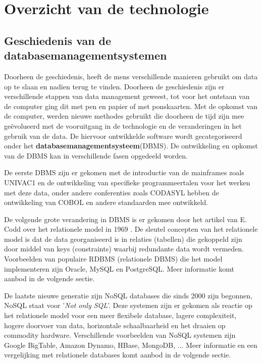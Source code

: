\chapter{Overzicht van de technologie}

\section{Geschiedenis van de databasemanagementsystemen}
Doorheen de geschiedenis, heeft de mens verschillende manieren gebruikt om data op te slaan en nadien terug te vinden. Doorheen de geschiedenis zijn er verschillende stappen van data management geweest, tot voor het ontstaan van de computer ging dit met pen en papier of met ponskaarten\cite{gray2007data}. Met de opkomst van de computer, werden nieuwe methodes gebruikt die doorheen de tijd zijn mee geëvolueerd met de vooruitgang in de technologie en de veranderingen in het gebruik van de data. De hiervoor ontwikkelde software wordt gecategoriseerd onder het \textbf{databasemanagementsysteem}(DBMS). De ontwikkeling en opkomst van de DBMS kan in verschillende fasen opgedeeld worden.  

De eerste DBMS zijn er gekomen met de introductie van de mainframes zoals UNIVAC1 en de ontwikkeling van specifieke programmeertalen voor het werken met deze data, onder andere conferenties zoals CODASYL hebben de ontwikkeling van COBOL en andere standaarden mee ontwikkeld\cite{gray2007data}.    

De volgende grote verandering in DBMS is er gekomen door het artikel van E. Codd over het relationele model in 1969 \cite{codd1970relational}. De sleutel concepten van het relationele model is dat de data georganiseerd is in relaties (tabellen) die gekoppeld zijn door middel van keys (constraints) waarbij redundante data wordt vermeden. 
Voorbeelden van populaire RDBMS (relationele DBMS) die het model implementeren zijn Oracle, MySQL en PostgreSQL. Meer informatie komt aanbod in de volgende sectie. 

De laatste nieuwe generatie zijn NoSQL databases die sinds 2000 zijn begonnen, NoSQL staat voor '\textit{Not only SQL}'. Deze systemen zijn er gekomen als reactie op het relationele model voor een meer flexibele database, lagere complexiteit, hogere doorvoer van data, horizontale schaalbaarheid en het draaien op commodity hardware.  Verschillende voorbeelden van NoSQL systemen zijn Google BigTable, Amazon Dynamo, HBase, MongoDB, ... \cite{Strauch.NoSQL} Meer informatie en een vergelijking met relationele databases komt aanbod in de volgende sectie. 


